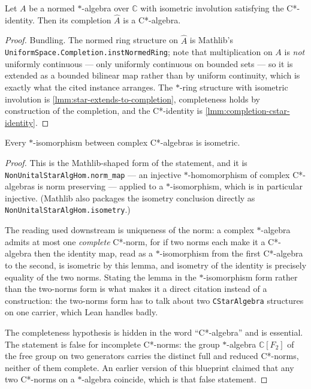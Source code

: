 \begin{lemma}
    \label{lmm:completion-of-cstar-normed-star-algebra}
    Let $A$ be a normed $*$-algebra over $\mathbb{C}$ with isometric involution satisfying the C*-identity. Then its completion $\widehat{A}$ is a C*-algebra.
\end{lemma}
\begin{proof}
    Bundling. The normed ring structure on $\widehat{A}$ is Mathlib's \texttt{UniformSpace.Completion.instNormedRing}; note that multiplication on $A$ is \emph{not} uniformly continuous --- only uniformly continuous on bounded sets --- so it is extended as a bounded bilinear map rather than by uniform continuity, which is exactly what the cited instance arranges. The $*$-ring structure with isometric involution is \ref{lmm:star-extends-to-completion}, completeness holds by construction of the completion, and the C*-identity is \ref{lmm:completion-cstar-identity}.
\end{proof}

\begin{lemma}
    \label{lmm:cstar-norm-unique}
    Every $*$-isomorphism between complex C*-algebras is isometric.
\end{lemma}
\begin{proof}
    This is the Mathlib-shaped form of the statement, and it is \texttt{NonUnitalStarAlgHom.norm\_map} --- an injective $*$-homomorphism of complex C*-algebras is norm preserving --- applied to a $*$-isomorphism, which is in particular injective. (Mathlib also packages the isometry conclusion directly as \texttt{NonUnitalStarAlgHom.isometry}.)

    The reading used downstream is uniqueness of the norm: a complex $*$-algebra admits at most one \emph{complete} C*-norm, for if two norms each make it a C*-algebra then the identity map, read as a $*$-isomorphism from the first C*-algebra to the second, is isometric by this lemma, and isometry of the identity is precisely equality of the two norms. Stating the lemma in the $*$-isomorphism form rather than the two-norms form is what makes it a direct citation instead of a construction: the two-norms form has to talk about two \texttt{CStarAlgebra} structures on one carrier, which Lean handles badly.

    The completeness hypothesis is hidden in the word ``C*-algebra'' and is essential. The statement is false for incomplete C*-norms: the group $*$-algebra $\mathbb{C}[F_2]$ of the free group on two generators carries the distinct full and reduced C*-norms, neither of them complete. An earlier version of this blueprint claimed that any two C*-norms on a $*$-algebra coincide, which is that false statement.
\end{proof}

